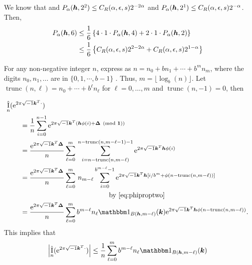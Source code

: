 \documentclass{amsart}
\DeclareMathOperator{\appxint}{\hat{I}}
\DeclareMathOperator{\trun}{trunc}
\begin{document}
We know that and $P_\alpha(\boldsymbol{h},2^2) \le C_{R}(\alpha,\epsilon,s)
    2^{-2\alpha}$ and $P_\alpha(\boldsymbol{h},2^1) \le C_{R}(\alpha,\epsilon,s)
    2^{-\alpha} $. Then,
    \begin{align*}
        P_\alpha(\boldsymbol{h},6) & \le \frac {1}{6} \left\{ 4 \cdot 1 \cdot P_\alpha(\boldsymbol{h},4) + 2 \cdot 1 \cdot P_\alpha(\boldsymbol{h},2) \right\} \\
         & \le \frac {1}{6} \left\{C_{R}(\alpha,\epsilon,s)
         2^{2-2\alpha} + C_{R}(\alpha,\epsilon,s)
         2^{1-\alpha} \right\}
    \end{align*}


For any non-negative integer $n$, express as  $n = n_0 + bn_1 + \cdots + b^m n_m$, where the digits $n_0, n_1, \ldots$ are in $\{0, 1, \cdots, b-1\}$ .  Thus, $m = \lfloor \log_b(n) \rfloor$.  Let $\trun(n,\ell) = n_0 + \cdots + b^{\ell} n_{\ell}$ for $\ell = 0, \ldots, m$ and $\trun(n,-1) = 0$, then

\begin{align*}
    \MoveEqLeft{\appxint_{n}(\me^{2 \pi \sqrt{-1} \vk^T \cdot}) } \\
    &= \frac 1{n} \sum_{i=0}^{n-1} \me^{2 \pi \sqrt{-1} \vk^T (\vh\phi(i) + \vDelta \pmod{\vone})} \\
    \nonumber
    &= \frac {\me^{2 \pi \sqrt{-1} \vk^T \vDelta}}{n} \sum_{\ell = 0}^{m} \,
    \sum_{i=n - \trun(n,m-\ell) }^{n - \trun(n,m-\ell-1)  -1} \me^{2 \pi \sqrt{-1} \vk^T \vh\phi(i)} \\
    &= \frac {\me^{2 \pi \sqrt{-1} \vk^T \vDelta}}{n} \sum_{\ell = 0}^{m} \, n_{m-\ell}
    \sum_{i=0 }^{b^{m-\ell}  -1} \me^{2 \pi \sqrt{-1} \vk^T \vh[i/b^m + \phi(n - \trun(n,m-\ell))]} \\
    & \hspace{30ex} \text{by \eqref{eq:phiproptwo}} \\
    & = \frac {\me^{2 \pi \sqrt{-1} \vk^T \vDelta}}{n} \sum_{\ell = 0}^{m} b^{m-\ell} n_\ell \bbone_{B(\vh,m-\ell)}(\vk) \me^{2 \pi \sqrt{-1} \vk^T \vh\phi(n - \trun(n,m-\ell))}.
\end{align*}
This implies that
\begin{equation} \label{eq:ihatarbn}
    \abs{\appxint_{n}(\me^{2 \pi \sqrt{-1} \vk^T \cdot})} \le \frac {1}{n} \sum_{\ell = 0}^{m} b^{m-\ell} n_\ell \bbone_{B(\vh,m-\ell)}(\vk)
\end{equation}
\end{document}
